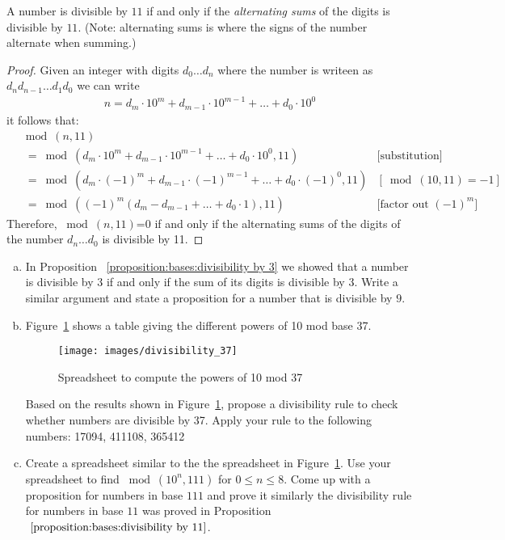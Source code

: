 \begin{prop}\label{proposition:bases:divisibility by 11}
A number is divisible by $11$ if and only if the \textit{alternating sums} of the digits is divisible by $11$. (Note: alternating sums is where the signs of the number alternate when summing.)
 
\begin{proof}
Given an integer with digits $d_{0}\dots d_{n}$ where the number is writeen as $d_{n}d_{n-1}\dots d_{1}d_{0}$ we can write
\begin{align*}
n=d_{m}\cdot 10^{m}+d_{m-1}\cdot 10^{m-1}+\dots +d_{0}\cdot 10^{0}
\end{align*} 
it follows that:
\begin{align*}
&\bmod(n,11) & \\
&~~=\bmod(d_{m}\cdot 10^{m}+d_{m-1}\cdot 10^{m-1}+\dots +d_{0}\cdot 10^{0},11) & \textrm{[substitution]}\\
&~~=\bmod(d_{m}\cdot (-1)^{m}+d_{m-1}\cdot (-1)^{m-1}+\dots+d_{0}\cdot (-1)^{0},11) & [\bmod(10,11)=-1]\\
&~~=\bmod \left( (-1)^m (d_m - d_{m-1}+\dots + d_{0}\cdot 1),11 \right) & \textrm{[factor out } (-1)^m]
\end{align*}
Therefore, $\bmod(n,11)$=0 if and only if the alternating sums of the digits of the number $d_{n}\dots d_{0}$ is divisible by 11.
\end{proof}
\end{prop}
\begin{exercise}\label{exercise:bases:mod 9 and mod 37}
\begin{enumerate}[(a)]
\item In Proposition ~\ref{proposition:bases:divisibility by 3} we showed that a number is divisible by $3$ if and only if the sum of its digits is divisible by $3$. Write a similar argument  and state a proposition for a number that is divisible by $9$.
\item Figure~\ref{powersOf10Mod37} shows a table giving the different powers of 10 mod base 37. 

\begin{figure}
\begin{center}
\centerline {
\texttt{[image: images/divisibility\_37]}
}
\end{center}
\caption{Spreadsheet to compute the powers of 10 mod 37}
\label{powersOf10Mod37}
\end{figure}

Based on the results shown in Figure~\ref{powersOf10Mod37}, propose a divisibility rule to check whether numbers are divisible by 37. Apply your rule to the following numbers: 17094,   411108, 365412\\

\item Create a spreadsheet similar to the the spreadsheet in Figure~\ref{powersOf10Mod37}. Use your spreadsheet to find $\bmod(10^{n},111)$ for $0\leq n\leq 8$. Come up with a proposition for numbers in base $111$ and prove it similarly  the divisibility rule for numbers in base $11$ was proved in Proposition $~\ref{proposition:bases:divisibility by 11}$.
\end{enumerate}
\end{exercise}

